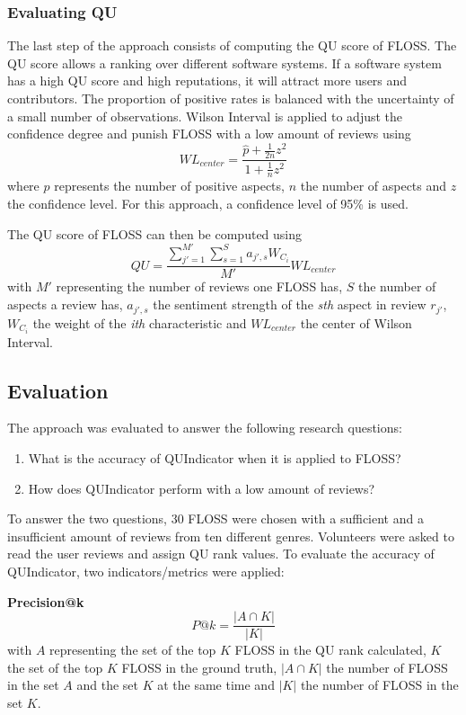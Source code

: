 \subsubsection*{Evaluating QU}
The last step of the approach consists of computing the QU score of FLOSS. The QU score allows a ranking over different software systems. If a software system has a high QU score and high reputations, it will attract more users and contributors. The proportion of positive rates is balanced with the uncertainty of a small number of observations. Wilson Interval is applied to adjust the confidence degree and punish FLOSS with a low amount of reviews using
\begin{equation}\label{eqn:2}
    WL_{center} = \frac{\hat{p} + \frac{1}{2n}z^2}{1 + \frac{1}{n}z^2}
\end{equation}
where $\hat{p}$ represents the number of positive aspects, $n$ the number of aspects and $z$ the confidence level. For this approach, a confidence level of 95\% is used.

The QU score of FLOSS can then be computed using
\begin{equation}\label{eqn:3}
    QU = \frac{\sum_{j'=1}^{M'} \sum_{s=1}^{S} a_{j', s}W_{C_i}}{M'}WL_{center}
\end{equation}
with $M'$ representing the number of reviews one FLOSS has, $S$ the number of aspects a review has, $a_{j', s}$ the sentiment strength of the \textit{sth} aspect in review $r_{j'}$, $W_{C_i}$ the weight of the \textit{ith} characteristic and $WL_{center}$ the center of Wilson Interval.

\subsection{Evaluation}
The approach was evaluated to answer the following research questions:
\begin{enumerate}
    \item What is the accuracy of QUIndicator when it is applied to FLOSS?
    \item How does QUIndicator perform with a low amount of reviews?
\end{enumerate}
To answer the two questions, 30 FLOSS were chosen with a sufficient and a insufficient amount of reviews from ten different genres. Volunteers were asked to read the user reviews and assign QU rank values. To evaluate the accuracy of QUIndicator, two indicators/metrics were applied:

\textbf{Precision@k}
\begin{equation*}
    P@k = \frac{|A \cap K|}{|K|}
\end{equation*}
with $A$ representing the set of the top $K$ FLOSS in the QU rank calculated, $K$ the set of the top $K$ FLOSS in the ground truth, $|A \cap K|$ the number of FLOSS in the set $A$ and the set $K$ at the same time and $|K|$ the number of FLOSS in the set $K$.


